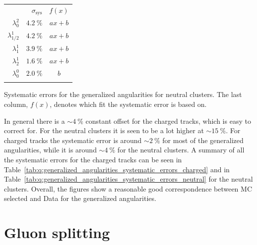 \begin{margintable}
  \centerfloat
  \begin{tabular}{@{}rrc@{}}
  {}             & $\sigma_\mathrm{sys}$ & $f(x)$ \\ \addlinespace[0.1em] \midrule \addlinespace[0.2em]
  $\lambda_0^2$        & $\SI{4.2}{\percent}$  & $ax+b$ \\ \addlinespace[0.2em]
  $\lambda_{1/2}^1$    & $\SI{4.2}{\percent}$  & $ax+b$ \\ \addlinespace[0.2em]
  $\lambda_1^1$        & $\SI{3.9}{\percent}$  & $ax+b$ \\ \addlinespace[0.2em]
  $\lambda_2^1$        & $\SI{1.6}{\percent}$  & $ax+b$ \\ \addlinespace[0.2em]
  $\lambda_0^0$        & $\SI{2.0}{\percent}$  & $b$ \\ \addlinespace[0.2em]
  \end{tabular}
  \vspace{3mm}
  \caption[Generalized Angularities Systematic Errors, Neutral Clusters]{\label{tab:q:generalized_angularities_systematic_errors_neutral}Systematic errors for the generalized angularities for neutral clusters.  The last column, $f(x)$, denotes which fit the systematic error is based on.}
\end{margintable}

In general there is a $\sim \SI{4}{\percent}$ constant offset for the charged tracks, which is easy to correct for. For the neutral clusters it is seen to be a lot higher at $\sim \SI{15}{\percent}$. For charged tracks the systematic error is around $\sim \SI{2}{\percent}$ for most of the generalized angularities, while it is around $\sim \SI{4}{\percent}$ for the neutral clusters. A summary of all the systematic errors for the charged tracks can be seen in Table~\ref{tab:q:generalized_angularities_systematic_errors_charged} and in Table~\ref{tab:q:generalized_angularities_systematic_errors_neutral} for the neutral clusters. Overall, the figures show a reasonable good correspondence between MC selected and Data for the generalized angularities.  

\section{Gluon splitting}
\label{sec:q:gluon_splitting_4j}

